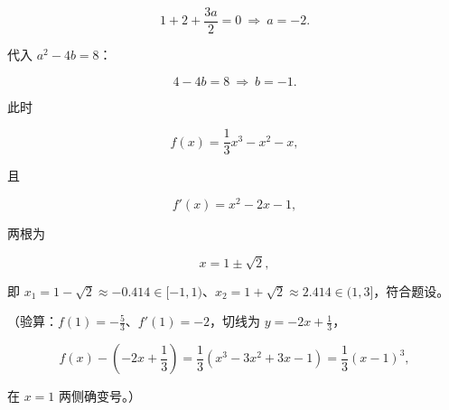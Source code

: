 \begin{answer}
\nopagebreak[4]
\[1+2+\frac{3a}{2}=0\ \Longrightarrow\ a=-2 .\]

代入 $a^2-4b=8$：

\nopagebreak[4]
\[4-4b=8\ \Longrightarrow\ b=-1 .\]

此时

\nopagebreak[4]
\[f(x)=\frac13x^3-x^2-x,\]

且

\nopagebreak[4]
\[f'(x)=x^2-2x-1,\]

两根为

\nopagebreak[4]
\[x=1\pm\sqrt2,\]

即 $x_1=1-\sqrt2\approx-0.414\in[-1,1)$、$x_2=1+\sqrt2\approx2.414\in(1,3]$，符合题设。

（验算：$f(1)=-\frac53$、$f'(1)=-2$，切线为 $y=-2x+\frac13$，

\nopagebreak[4]
\[f(x)-\left(-2x+\frac13\right)=\frac13(x^3-3x^2+3x-1)=\frac13(x-1)^3,\]

在 $x=1$ 两侧确变号。）


\end{answer}